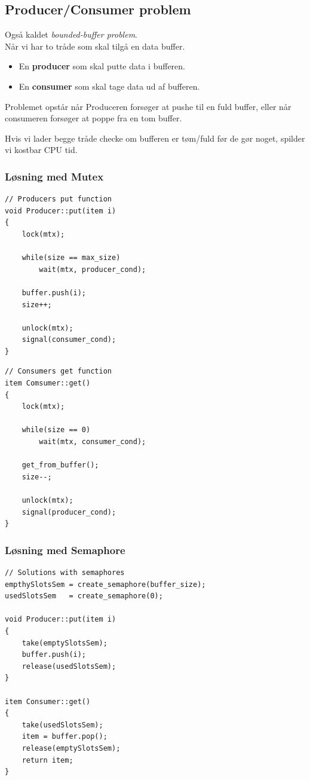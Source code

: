 \subsection{Producer/Consumer problem}
Også kaldet \textit{bounded-buffer problem}.\\

Når vi har to tråde som skal tilgå en data buffer.

\begin{itemize}
	\item En \textbf{producer} som skal putte data i bufferen.
	\item En \textbf{consumer} som skal tage data ud af bufferen.
\end{itemize}

Problemet opstår når Produceren forsøger at pushe til en fuld buffer, eller når consumeren forsøger at poppe fra en tom buffer.

Hvis vi lader begge tråde checke om bufferen er tøm/fuld før de gør noget, spilder vi kostbar CPU tid.

\subsubsection{Løsning med Mutex}

\begin{lstlisting}[otherkeywords={item, buffer, unlock, lock, signal}]
// Producers put function
void Producer::put(item i)
{
	lock(mtx);
	
	while(size == max_size)
		wait(mtx, producer_cond);
		
	buffer.push(i);
	size++;
	
	unlock(mtx);
	signal(consumer_cond);
}
\end{lstlisting}

\begin{lstlisting}
// Consumers get function
item Comsumer::get()
{
	lock(mtx);
	
	while(size == 0)
		wait(mtx, consumer_cond);
		
	get_from_buffer();
	size--;
	
	unlock(mtx);
	signal(producer_cond);
}
\end{lstlisting}

\subsubsection{Løsning med Semaphore}
\begin{lstlisting}[otherkeywords={create_semaphore, take, push, release, item}]
// Solutions with semaphores
empthySlotsSem = create_semaphore(buffer_size);
usedSlotsSem   = create_semaphore(0);

void Producer::put(item i)
{
	take(emptySlotsSem);
	buffer.push(i);
	release(usedSlotsSem);
}

item Consumer::get()
{
	take(usedSlotsSem);
	item = buffer.pop();
	release(emptySlotsSem);
	return item;
}
\end{lstlisting}

